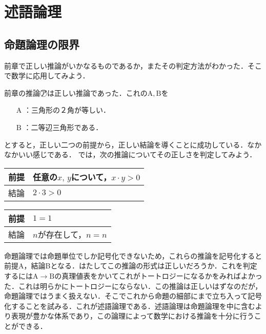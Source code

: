\documentclass[10pt,b5paper,papersize,dvipdfmx]{jsbook}
\newcommand\rmA{\mathrm{A}}
\newcommand\rmB{\mathrm{B}}
\newcommand\maru[1]{\textcircled{\scriptsize{}#1}}
\begin{document}
\section{述語論理}
\subsection{命題論理の限界}
前章で正しい推論がいかなるものであるか，またその判定方法がわかった．そこで数学に応用してみよう．\par
前章の推論\maru{ア}は正しい推論であった．これの$\rmA, \rmB$を
\begin{itemize}
  \item[$\rmA$]：三角形の２角が等しい．
  \item[$\rmB$]：二等辺三角形である．
\end{itemize}
とすると，正しい二つの前提から，正しい結論を導くことに成功している．なかなかいい感じである．
では，次の推論についてその正しさを判定してみよう．
\begin{table}[H]
  \begin{tabular}{ll}
    前提 & 任意の$x,\, y$について，$x \cdot y>0$ \\ \hline
    結論 & $2 \cdot 3 > 0$\\
  \end{tabular}
\end{table}
\begin{table}[H]
  \begin{tabular}{ll}
    前提 & $1 = 1$ \\ \hline
    結論 & $n$が存在して，$n = n$\\
  \end{tabular}
\end{table}
命題論理では命題単位でしか記号化できないため，これらの推論を記号化すると前提A，結論Bとなる．はたしてこの推論の形式は正しいだろうか．これを判定するには$\rmA\to\rmB$の真理値表をかいてこれがトートロジーになるかをみればよかった．これは明らかにトートロジーにならない．この推論は正しいはずなのだが，命題論理ではうまく扱えない．そこでこれから命題の細部にまで立ち入って記号化することを試みる．これが述語論理である．述語論理は命題論理を中に含むより表現が豊かな体系であり，この論理によって数学における推論を十分に行うことができる．
\end{document}
